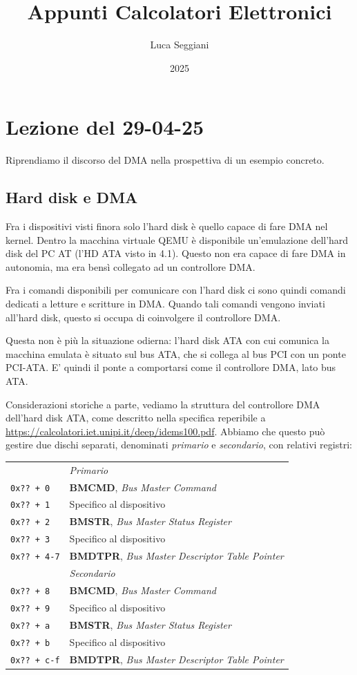 \documentclass[a4paper,11pt]{article}
\title{Appunti Calcolatori Elettronici}
\author{Luca Seggiani}
\date{2025}
\begin{document}
\section{Lezione del 29-04-25}

\thispagestyle{empty}
\pagestyle{fancy}

Riprendiamo il discorso del DMA nella prospettiva di un esempio concreto.

\subsection{Hard disk e DMA}
Fra i dispositivi visti finora solo l'hard disk è quello capace di fare DMA nel kernel.
Dentro la macchina virtuale QEMU è disponibile un'emulazione dell'hard disk del PC AT (l'HD ATA visto in 4.1).
Questo non era capace di fare DMA in autonomia, ma era bensì collegato ad un controllore DMA.

Fra i comandi disponibili per comunicare con l'hard disk ci sono quindi comandi dedicati a letture e scritture in DMA.
Quando tali comandi vengono inviati all'hard disk, questo si occupa di coinvolgere il controllore DMA.

Questa non è più la situazione odierna: l'hard disk ATA con cui comunica la macchina emulata è situato sul bus ATA, che si collega al bus PCI con un ponte PCI-ATA.
E' quindi il ponte a comportarsi come il controllore DMA, lato bus ATA.

Considerazioni storiche a parte, vediamo la struttura del controllore DMA dell'hard disk ATA, come descritto nella specifica reperibile a \url{https://calcolatori.iet.unipi.it/deep/idems100.pdf}.
Abbiamo che questo può gestire due dischi separati, denominati \textit{primario} e \textit{secondario}, con relativi registri:
\begin{table}[h!]
	\center
	\begin{tabular} { p{1.7cm} | p{9cm} }
		& \textit{Primario} \\
		\lstinline|0x?? + 0| & \textbf{BMCMD}, \textit{Bus Master Command} \\
		\lstinline|0x?? + 1| & Specifico al dispositivo \\
		\lstinline|0x?? + 2| & \textbf{BMSTR}, \textit{Bus Master Status Register} \\
		\lstinline|0x?? + 3| & Specifico al dispositivo \\
		\lstinline|0x?? + 4-7| & \textbf{BMDTPR}, \textit{Bus Master Descriptor Table Pointer} \\
		\hline
		& \textit{Secondario} \\
		\lstinline|0x?? + 8| & \textbf{BMCMD}, \textit{Bus Master Command} \\
		\lstinline|0x?? + 9| & Specifico al dispositivo \\
		\lstinline|0x?? + a| & \textbf{BMSTR}, \textit{Bus Master Status Register} \\
		\lstinline|0x?? + b| & Specifico al dispositivo \\
		\lstinline|0x?? + c-f| & \textbf{BMDTPR}, \textit{Bus Master Descriptor Table Pointer} \\
	\end{tabular}
\end{table}
\end{document}
